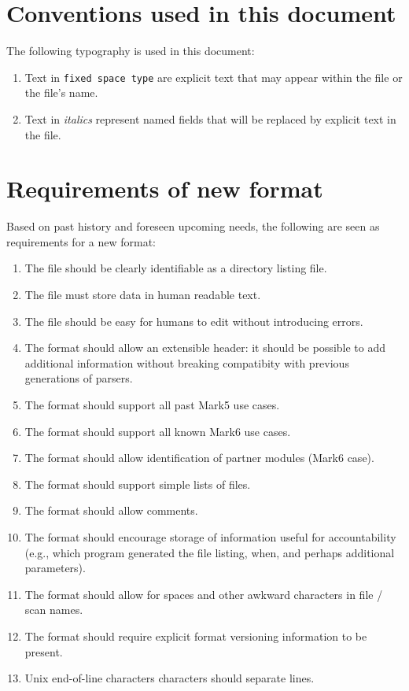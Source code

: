\documentclass[12pt]{article}
\begin{document}
\section{Conventions used in this document}

The following typography is used in this document:
\begin{enumerate}
\item Text in {\tt fixed space type} are explicit text that may appear within the file or the file's name.
\item Text in {\em italics} represent named fields that will be replaced by explicit text in the file.
\end{enumerate}

\section{Requirements of new format}

Based on past history and foreseen upcoming needs, the following are seen as requirements for a new format:
\begin{enumerate}
\item The file should be clearly identifiable as a directory listing file.
\item The file must store data in human readable text.
\item The file should be easy for humans to edit without introducing errors.
\item The format should allow an extensible header: it should be possible to add additional information without breaking compatibity with previous generations of parsers.
\item The format should support all past Mark5 use cases.
\item The format should support all known Mark6 use cases.
\item The format should allow identification of partner modules (Mark6 case).
\item The format should support simple lists of files.
\item The format should allow comments.
\item The format should encourage storage of information useful for accountability (e.g., which program generated the file listing, when, and perhaps additional parameters).
\item The format should allow for spaces and other awkward characters in file / scan names.
\item The format should require explicit format versioning information to be present.
\item Unix end-of-line characters characters should separate lines.
\end{enumerate}
\end{document}
